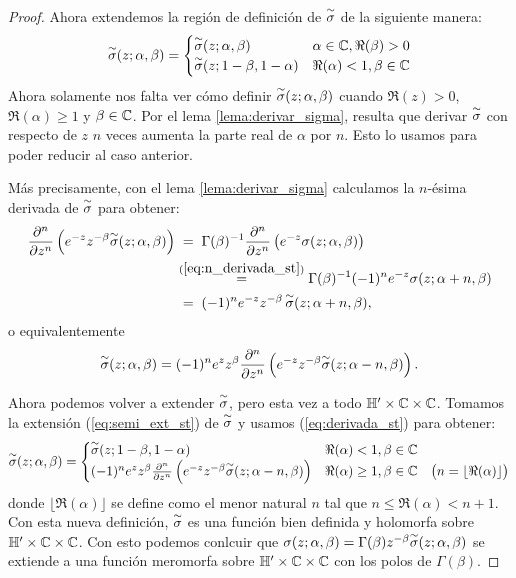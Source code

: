 \begin{proof}
Ahora extendemos la regi\'on de definici\'on de $\overset{\sim}{\sigma}$ de la siguiente manera:
\begin{equation}\label{eq:semi_ext_st}
  \overset{\sim}{\sigma}(z;\alpha,\beta)=
  \begin{cases}
    \overset{\sim}{\sigma}(z;\alpha,\beta) & \alpha\in\mathbb{C},\Re(\beta)>0\\
    \overset{\sim}{\sigma}(z;1-\beta,1-\alpha) & \Re(\alpha)<1,\beta\in\mathbb{C}
  \end{cases}
\end{equation}
Ahora solamente nos falta ver c\'omo definir $\overset{\sim}{\sigma}(z;\alpha,\beta)$ cuando $\Re(z)>0$,
$\Re(\alpha)\geq1$ y $\beta\in\mathbb{C}$. Por el lema \ref{lema:derivar_sigma}, resulta que derivar
$\overset{\sim}{\sigma}$ con respecto de $z$ $n$ veces aumenta la parte real de $\alpha$ por $n$. Esto  lo usamos
para poder reducir al caso anterior.

M\'as precisamente, con el lema \ref{lema:derivar_sigma} calculamos la $n$-\'esima derivada de
$\overset{\sim}{\sigma}$ para obtener:
\begin{align*}
  \frac{\partial^n}{\partial z^n}\left( e^{-z}z^{-\beta}\overset{\sim}{\sigma}(z;\alpha,\beta) \right)
  &\;=\;\Gamma(\beta)^{-1}\frac{\partial^n}{\partial z^n}\left( e^{-z}\sigma(z;\alpha,\beta) \right)\\
  &\overset{(\ref{eq:n_derivada_st})}{=}\Gamma(\beta)^{-1}(-1)^ne^{-z}\sigma(z;\alpha+n,\beta)\\
  &\;=\;(-1)^ne^{-z}z^{-\beta}\,\overset{\sim}{\sigma}(z;\alpha+n,\beta),
\end{align*}
o equivalentemente
\begin{equation}\label{eq:derivada_st}
  \overset{\sim}{\sigma}(z;\alpha,\beta)=
  (-1)^ne^zz^{\beta}\frac{\partial^n}{\partial z^n}\left( e^{-z}z^{-\beta}\overset{\sim}{\sigma}(z;\alpha-n,\beta) \right).
\end{equation}

Ahora podemos volver a extender $\overset{\sim}{\sigma}$, pero esta vez a todo $\mathbb{H}'\times\mathbb{C}\times\mathbb{C}$. Tomamos la
extensi\'on (\ref{eq:semi_ext_st}) de $\overset{\sim}{\sigma}$ y usamos (\ref{eq:derivada_st}) para obtener:
\[
   \overset{\sim}{\sigma}(z;\alpha,\beta)=
  \begin{cases}
    \overset{\sim}{\sigma}(z;1-\beta,1-\alpha) & \Re(\alpha)<1,\beta\in\mathbb{C}\\
    (-1)^ne^zz^{\beta}\frac{\partial^n}{\partial z^n}\left( e^{-z}z^{-\beta}\overset{\sim}{\sigma}(z;\alpha-n,\beta) \right)
    & \Re(\alpha)\geq 1,\beta\in\mathbb{C}\quad\big(n=\lfloor\Re(\alpha)\rfloor\big)
  \end{cases}
\]
donde $\lfloor\Re(\alpha)\rfloor$ se define como el menor natural $n$ tal que
$n\leq \Re(\alpha)<n+1$. Con esta nueva definici\'on, $\overset{\sim}{\sigma}$ es una funci\'on bien definida
y holomorfa sobre $\mathbb{H}'\times\mathbb{C}\times\mathbb{C}$. Con esto podemos conlcuir que
$\sigma(z;\alpha,\beta)=\Gamma(\beta)z^{-\beta}\overset{\sim}{\sigma}(z;\alpha,\beta)$ se extiende a una funci\'on
meromorfa sobre $\mathbb{H}'\times\mathbb{C}\times\mathbb{C}$ con los polos de $\Gamma(\beta)$.
\end{proof}

